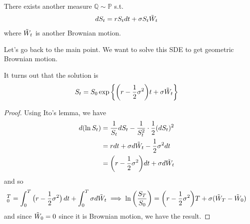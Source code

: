 \documentclass{article}
\begin{document}
    \begin{theorem}
      There exists another measure $\mathbb{Q} \sim \mathbb{P}$ s.t. 
      \begin{equation}
        dS_t = r S_t dt + \sigma S_t \Tilde{W}_t 
      \end{equation}
      where $\Tilde{W}_t$ is another Brownian motion. 
    \end{theorem}

    Let's go back to the main point. We want to solve this SDE to get geometric Brownian motion. 

    \begin{theorem}
      It turns out that the solution is 
      \begin{equation}
        S_t = S_0 \exp \bigg\{ \bigg( r - \frac{1}{2} \sigma^2 \bigg) t + \sigma \Tilde{W}_t \bigg\}
      \end{equation}
    \end{theorem}
    \begin{proof}
      Using Ito's lemma, we have 
      \begin{align}
        d (\ln S_t) & = \frac{1}{S_t} dS_t - \frac{1}{S_t^2} \cdot \frac{1}{2} (d S_t)^2 \\ 
                    & = r dt + \sigma d \Tilde{W}_t - \frac{1}{2} \sigma^2 dt \\
                    & = \bigg( r - \frac{1}{2} \sigma^2 \bigg) dt + \sigma d \Tilde{W}_t
      \end{align}
      and so 
      \begin{equation}
        [ \ln S_T ]_0^T = \int_0^T \big( r - \frac{1}{2} \sigma^2 \big) \,dt + \int_0^T \sigma d\Tilde{W}_t \implies \ln \bigg( \frac{S_T}{S_0} \bigg) = \bigg( r - \frac{1}{2} \sigma^2 \bigg) T + \sigma (\Tilde{W}_T - \Tilde{W}_0)
      \end{equation}
      and since $\Tilde{W}_0 = 0$ since it is Brownian motion, we have the result. 
    \end{proof}
\end{document}
